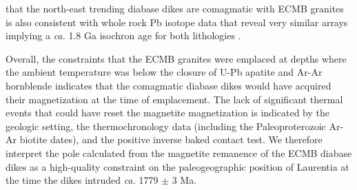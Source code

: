 \documentclass[draft]{agujournal2019}
\begin{document}
that the north-east trending diabase dikes are comagmatic with ECMB granites is also consistent with whole rock Pb isotope data that reveal very similar arrays implying a \textit{ca.} 1.8 Ga isochron age for both lithologies \cite{Horan1987a}. 


Overall, the constraints that the ECMB granites were emplaced at depths where the ambient temperature was below the closure of U-Pb apatite and Ar-Ar hornblende indicates that the comagmatic diabase dikes would have acquired their magnetization at the time of emplacement. The lack of significant thermal events that could have reset the magnetite magnetization is indicated by the geologic setting, the thermochronology data (including the Paleoproterozoic Ar-Ar biotite dates), and the positive inverse baked contact test. We therefore interpret the pole calculated from the magnetite remanence of the ECMB diabase dikes as a high-quality constraint on the paleogeographic position of Laurentia at the time the dikes intruded \textit{ca.} 1779 $\pm$ 3 Ma.
\end{document}
